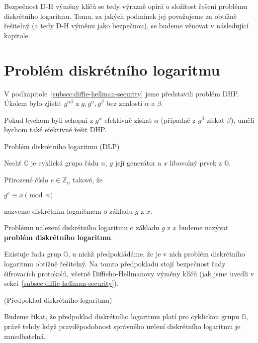 \documentclass[
  program=infoi,
  biblatex,
  figures=false,
  glossaries,
  index
]{kidiplom}
\begin{document}
        Bezpečnost D-H výměny klíčů se tedy výrazně opírá o složitost řešení problému diskrétního logaritmu.
        Tomu, za jakých podmínek jej považujeme za obtížně řešitelný (a tedy D-H výměnu jako bezpečnou), se budeme věnovat v následující kapitole.
    

\section{Problém diskrétního logaritmu}\label{sec:discrete-log}

        V podkapitole~\ref{subsec:diffie-hellman-security} jsme představili problém DHP.
        Úkolem bylo zjistit $g^{\alpha \beta}$ z $g, g^\alpha, g^\beta$ bez znalosti $\alpha$ a $\beta$.

        Pokud bychom byli schopni z $g^\alpha$ efektivně získat $\alpha$ (případně z $g^\beta$ získat $\beta$), uměli bychom také
        efektivně řešit DHP.


        \begin{definition}
            Problém diskrétního logaritmu (DLP)
            
            Nechť $\mathbb{G}$ je cyklická grupa řádu $n$, $g$ její generátor a $x$ libovolný prvek z $\mathbb{G}$.

            Přirozené číslo $e \in \mathbb{Z}_n$ takové, že
                \begin{center}
                    $g^e \equiv x \pmod{n}$
                \end{center}
            
            nazveme diskrétním logaritmem o základu $g$ z $x$.

            Problému nalezení diskrétního logaritmu o základu $g$ z $x$ budeme nazývat \textbf{problém diskrétního logaritmu}.

        \end{definition}
        
        Existuje řada grup $\mathbb{G}$, u nichž předpokládáme, že je v nich problém diskrétního logaritmu obtížně řešitelný.
        Na tomto předpokladu stojí bezpečnost řady šifrovacích protokolů, včetně Diffieho-Hellmanovy výměny klíčů
        (jak jsme uvedli v sekci~\ref{subsec:diffie-hellman-security}).


        \begin{definition}
            (Předpoklad diskrétního logaritmu)
            
            Budeme říkat, že předpoklad diskrétního logaritmu platí pro cyklickou grupu $\mathbb{G}$, právě tehdy když
            pravděpodobnost správného určení diskrétního logaritmu je zanedbatelná. 

        \end{definition}
\end{document}
